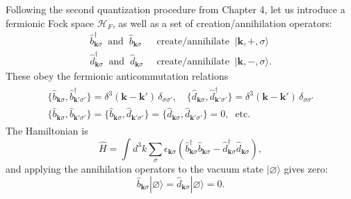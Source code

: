 \documentclass[pra,12pt]{revtex4}
\begin{document}
Following the second quantization procedure from Chapter 4, let us
introduce a fermionic Fock space $\mathscr{H}_F$, as well as a set of
creation/annihilation operators:
\begin{align*}
  \hat{b}_{\mathbf{k}\sigma}^\dagger \;\; \mathrm{and} \;\; \hat{b}_{\mathbf{k}\sigma}
  &\;\;\mathrm{create/annihilate} \;\; |\mathbf{k}, +, \sigma\rangle\\
  \hat{d}_{\mathbf{k}\sigma}^\dagger \;\; \mathrm{and} \;\; \hat{d}_{\mathbf{k}\sigma}
  &\;\;\mathrm{create/annihilate} \;\; |\mathbf{k}, -, \sigma\rangle.
\end{align*}
These obey the fermionic anticommutation relations
\begin{align}
  \begin{aligned}
    \{\hat{b}_{\mathbf{k}\sigma}, \hat{b}_{\mathbf{k}'\sigma'}^\dagger \}
    = \delta^3(\mathbf{k}-\mathbf{k}') \, \delta_{\sigma\sigma'}, \quad
    \{\hat{d}_{\mathbf{k}\sigma}, \hat{d}_{\mathbf{k}'\sigma'}^\dagger \}
    = \delta^3(\mathbf{k}-\mathbf{k}') \, \delta_{\sigma\sigma'} \\
    \{\hat{b}_{\mathbf{k}\sigma}, \hat{b}_{\mathbf{k}'\sigma'} \} = 
    \{\hat{b}_{\mathbf{k}\sigma}, \hat{d}_{\mathbf{k}'\sigma'} \} = 
    \{\hat{d}_{\mathbf{k}\sigma}, \hat{d}_{\mathbf{k}'\sigma'} \} = 0, \;\;\textrm{etc.}
  \end{aligned}
  \label{Diracanticommutation0}
\end{align}
The Hamiltonian is
\begin{equation}
  \hat{H} = \int d^3k \sum_\sigma \epsilon_{\mathbf{k}\sigma} \left(
  \hat{b}^\dagger_{\mathbf{k}\sigma} \hat{b}_{\mathbf{k}\sigma}
  - \hat{d}^\dagger_{\mathbf{k}\sigma} \hat{d}_{\mathbf{k}\sigma}
  \right),
  \label{HDiracQFT0}
\end{equation}
and applying the annihilation operators to the vacuum state
$|\varnothing\rangle$ gives zero:
\begin{equation}
  \hat{b}_{\mathbf{k}\sigma} |\varnothing\rangle =
  \hat{d}_{\mathbf{k}\sigma} |\varnothing\rangle = 0.
\end{equation}
\end{document}
